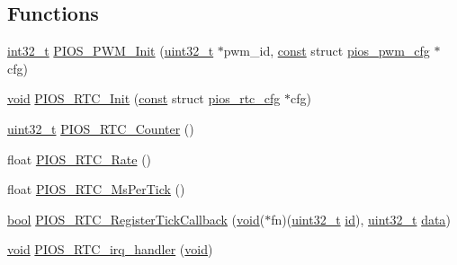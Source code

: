 \subsection*{Functions}
\begin{DoxyCompactItemize}
\item 
\hyperlink{group___n_a_m_e_gafd12020da5a235dfcf0c3c748fb5baed}{int32\-\_\-t} \hyperlink{group___p_i_o_s___p_w_m_ga710b446b9a2b2d27624571eb968ae09f}{P\-I\-O\-S\-\_\-\-P\-W\-M\-\_\-\-Init} (\hyperlink{stdint_8h_a435d1572bf3f880d55459d9805097f62}{uint32\-\_\-t} $\ast$pwm\-\_\-id, \hyperlink{group___n_a_m_e_ga7ae6d0e43244213b34de2c2b9aa30da6}{const} struct \hyperlink{structpios__pwm__cfg}{pios\-\_\-pwm\-\_\-cfg} $\ast$cfg)
\item 
\hyperlink{group___n_a_m_e_ga18028b8badbf1ea7e704ccac3c488e82}{void} \hyperlink{group___p_i_o_s___p_w_m_ga0edcdea74daf967c3ebbf09d14f21f95}{P\-I\-O\-S\-\_\-\-R\-T\-C\-\_\-\-Init} (\hyperlink{group___n_a_m_e_ga7ae6d0e43244213b34de2c2b9aa30da6}{const} struct \hyperlink{structpios__rtc__cfg}{pios\-\_\-rtc\-\_\-cfg} $\ast$cfg)
\item 
\hyperlink{stdint_8h_a435d1572bf3f880d55459d9805097f62}{uint32\-\_\-t} \hyperlink{group___p_i_o_s___p_w_m_ga9d01d1ac8ca6944639f49eeb358a5283}{P\-I\-O\-S\-\_\-\-R\-T\-C\-\_\-\-Counter} ()
\item 
float \hyperlink{group___p_i_o_s___p_w_m_ga67f1e1979b94ff871968e14497974af1}{P\-I\-O\-S\-\_\-\-R\-T\-C\-\_\-\-Rate} ()
\item 
float \hyperlink{group___p_i_o_s___p_w_m_gad34cae8cd02b5e6de39366292722edba}{P\-I\-O\-S\-\_\-\-R\-T\-C\-\_\-\-Ms\-Per\-Tick} ()
\item 
\hyperlink{group___exported__types_gaf6a258d8f3ee5206d682d799316314b1}{bool} \hyperlink{group___p_i_o_s___p_w_m_gaedab634636153fb8507f2fd1667c6f39}{P\-I\-O\-S\-\_\-\-R\-T\-C\-\_\-\-Register\-Tick\-Callback} (\hyperlink{group___n_a_m_e_ga18028b8badbf1ea7e704ccac3c488e82}{void}($\ast$fn)(\hyperlink{stdint_8h_a435d1572bf3f880d55459d9805097f62}{uint32\-\_\-t} \hyperlink{group___u_a_v_gabaabdc509cdaba7df9f56c6c76f3ae19}{id}), \hyperlink{stdint_8h_a435d1572bf3f880d55459d9805097f62}{uint32\-\_\-t} \hyperlink{pios__opahrs__proto_8h_a20e3f4bfaeccf09a75ef27e095a10112}{data})
\item 
\hyperlink{group___n_a_m_e_ga18028b8badbf1ea7e704ccac3c488e82}{void} \hyperlink{group___p_i_o_s___p_w_m_ga882b48b1e7ce218715dbcc6268387eb7}{P\-I\-O\-S\-\_\-\-R\-T\-C\-\_\-irq\-\_\-handler} (\hyperlink{group___n_a_m_e_ga18028b8badbf1ea7e704ccac3c488e82}{void})
\end{DoxyCompactItemize}
